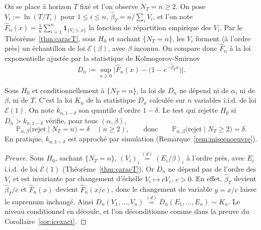 On se place à horizon $T$ fixé et l'on observe $N_T=n\ge2$. On pose $V_i:=\ln(T/T_i)$ pour $1\le i\le n$, $\hat\beta_T=n/\sum_iV_i$, et l'on note $\hat F_n(x)=\frac1n\sum_{i=1}^n\mathbf{1}_{\{V_i\le x\}}$ la fonction de répartition empirique des $V_i$. Par le Théorème~\ref{thm:caracT}, sous $H_0$ et sachant $\{N_T=n\}$, les $V_i$ forment (à l'ordre près) un échantillon de loi $\mathcal{E}(\beta)$, avec $\beta$ inconnu. On compare donc $\hat F_n$ à la loi exponentielle ajustée par la statistique de Kolmogorov-Smirnov
\[
D_n:=\sup_{x\ge0}\Big|\hat F_n(x)-\big(1-e^{-\hat\beta_Tx}\big)\Big|.
\]

\begin{proposition}\label{prop:pivot}
Sous $H_0$ et conditionnellement à $\{N_T=n\}$, la loi de $D_n$ ne dépend ni de $\alpha$, ni de $\beta$, ni de $T$. C'est la loi $K_n$ de la statistique $D_n$ calculée sur $n$ variables i.i.d. de loi $\mathcal{E}(1)$. On note $k_{n,1-\delta}$ son quantile d'ordre $1-\delta$. Le test qui rejette $H_0$ si $D_n>k_{n,1-\delta}$ vérifie, pour tous $(\alpha,\beta)$,
\[
\mathbb{P}_{\alpha,\beta}\big(\text{rejet}\mid N_T=n\big)=\delta\quad(n\ge2),\qquad\text{donc}\qquad\mathbb{P}_{\alpha,\beta}\big(\text{rejet}\mid N_T\ge2\big)=\delta.
\]
En pratique, $k_{n,1-\delta}$ est approché par simulation (Remarque~\ref{rem:miseenoeuvre}).
\end{proposition}

\begin{proof}[Preuve]
Sous $H_0$, sachant $\{N_T=n\}$, $(V_i)_i\overset{(d)}{=}(E_i/\beta)_i$ à l'ordre près, avec $E_i$ i.i.d. de loi $\mathcal{E}(1)$ (Théorème~\ref{thm:caracT}). Or $D_n$ ne dépend pas de l'ordre des $V_i$ et est invariante par changement d'échelle $V_i\mapsto cV_i$, $c>0$. En effet, $\hat\beta_T$ devient $\hat\beta_T/c$ et $\hat F_n(x)$ devient $\hat F_n(x/c)$, donc le changement de variable $y=x/c$ laisse le supremum inchangé. Ainsi $D_n(V_1,\dots,V_n)\overset{(d)}{=}D_n(E_1,\dots,E_n)\sim K_n$. Le niveau conditionnel en découle, et l'on déconditionne comme dans la preuve du Corollaire~\ref{cor:icexact}.
\end{proof}

